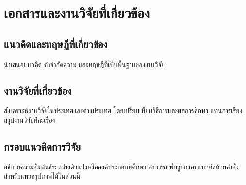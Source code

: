 \chapter{เอกสารและงานวิจัยที่เกี่ยวข้อง}
\section{แนวคิดและทฤษฎีที่เกี่ยวข้อง}
นำเสนอแนวคิด คำจำกัดความ และทฤษฎีที่เป็นพื้นฐานของงานวิจัย
\section{งานวิจัยที่เกี่ยวข้อง}
สังเคราะห์งานวิจัยในประเทศและต่างประเทศ โดยเปรียบเทียบวิธีการและผลการศึกษา
แทนการเรียงสรุปงานวิจัยทีละเรื่อง
\section{กรอบแนวคิดการวิจัย}
อธิบายความสัมพันธ์ระหว่างตัวแปรหรือองค์ประกอบที่ศึกษา
สามารถเพิ่มรูปกรอบแนวคิดด้วยคำสั่งสำหรับแทรกรูปภาพได้ในส่วนนี้
